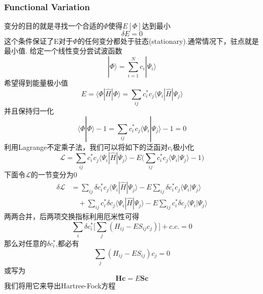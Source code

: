 \documentclass[fontset=none,12pt,a4paper]{ctexart}
\numberwithin{equation}{section}
\begin{document}
\subsubsection{Functional Variation}
变分的目的就是寻找一个合适的$\Phi$使得$E[\Phi]$达到最小
\begin{equation}
  \delta E=0
\end{equation}
这个条件保证了E对于$\Phi$的任何变分都处于驻态(stationary).通常情况下，驻点就是最小值.
给定一个线性变分尝试波函数
\begin{equation}
  |\Phi\rangle=\sum_{i=1}^{N}c_i|\Psi_i\rangle
\end{equation}
希望得到能量极小值
\begin{equation}
  E=\langle \Phi|\hat{H}|\Phi\rangle=\sum_{ij}c_i^*c_j\langle\Psi_i|\hat{H}|\Psi_j\rangle
\end{equation}
并且保持归一化
\begin{equation}
\langle\Phi|\Phi\rangle-1=\sum_{ij}c_i^*c_j\langle\Psi_i|\Psi_j\rangle-1=0
\end{equation}
利用Lagrange不定乘子法，我们可以将如下的泛函对$c_i$极小化
\begin{equation}
  \mathcal{L}=\sum_{ij}c_i^*c_j\langle\Psi_i|\hat{H}|\Psi_j\rangle-E\biggl(\sum_{ij}c_i^*c_j\langle\Psi_i|\Psi_j\rangle-1\biggr)
\end{equation}
下面令$\mathcal{L}$的一节变分为0
\begin{equation}
  \begin{aligned}
  \delta\mathcal{L}&=\sum_{ij}\delta c_i^*c_j\langle\Psi_i|\hat{H}|\Psi_j\rangle-E\sum_{ij}\delta c_i^*c_j\langle\Psi_i|\Psi_j\rangle \\
  &\quad +\sum_{ij}c_i^*\delta c_j\langle\Psi_i|\hat{H}|\Psi_j\rangle-E\sum_{ij}c_i^*\delta c_j\langle\Psi_i|\Psi_j\rangle
  \end{aligned}
\end{equation}
两两合并，后两项交换指标利用厄米性可得
\begin{equation}
  \sum_{i}\delta c_i^*\big[\sum_j( H_{ij}-ES_{ij}c_{j})\big]+c.c. =0
\end{equation}
那么对任意的$\delta c_i^*$,都必有
\begin{equation}
\sum_j( H_{ij}-ES_{ij})c_j =0
\end{equation}
或写为
\begin{equation}
  \mathbf{Hc}=E\mathbf{Sc}
\end{equation}
我们将用它来导出Hartree-Fock方程
\end{document}
